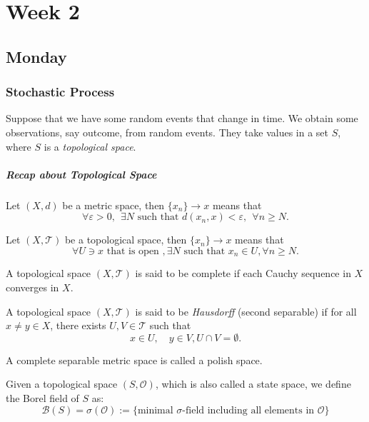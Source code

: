 
\chapter{Week 2}

\section{Monday}
\subsection{Stochastic Process}
Suppose that we have some random events that change in time.
We obtain some observations, say outcome, from random events.
They take values in a set $S$, where $S$ is a \emph{topological space}.

\paragraph{Recap about Topological Space}
\begin{definition}
Let $(X,d)$ be a metric space, then $\{x_n\}\to x$ means that 
\[
\forall \varepsilon>0,~~\exists N\text{ such that }d(x_n,x)<\varepsilon,~~\forall n\ge N.
\]
\end{definition}

\begin{definition}
Let $(X,\mathcal{T})$ be a topological space, then $\{x_n\}\to x$ means that 
\[
\forall U\ni x\text{ that is open }, \exists N\text{ such that }x_n\in U,\forall n\ge N.
\]
\end{definition}
\begin{definition}[Complete]
A topological space $(X,\mathcal{T})$ is said to be complete if each Cauchy sequence in $X$ converges in $X$.
\end{definition}
\begin{definition}[Separable]
A topological space $(X,\mathcal{T})$ is said to be \emph{Hausdorff} (second separable) if for all $x\ne y\in X$, there exists $U,V\in\mathcal{T}$ such that 
\[
x\in U,\quad
y\in V,
U\cap V=\emptyset.
\]
\end{definition}
\begin{definition}
A complete separable metric space is called a polish space.
\end{definition}

Given a topological space $(S,\mathcal{O})$, which is also called a state space, we define the Borel field of $S$ as:
\[
\mathcal{B}(S)=\sigma(\mathcal{O}):=\{
\mbox{minimal $\sigma$-field including all elements in $\mathcal{O}$}
\}
\]

